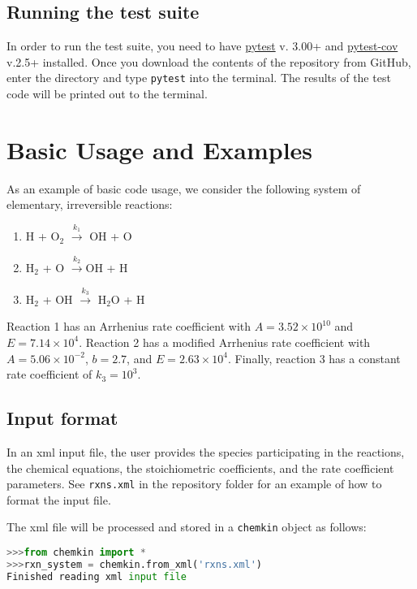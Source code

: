 \documentclass[12pt]{article}
\begin{document}
\subsection{Running the test suite}
In order to run the test suite, you need to have \href{https://docs.pytest.org/en/latest/}{pytest} v. 3.00+ and \href{https://pypi.python.org/pypi/pytest-cov}{pytest-cov} v.2.5+ installed. Once you download the contents of the repository from GitHub, enter the directory and type {\tt pytest} into the terminal. The results of the test code will be printed out to the terminal.

\section{Basic Usage and Examples}
As an example of basic code usage, we consider the following system of elementary, irreversible reactions:

\begin{enumerate}
\item H + O$_2$ $\overset{k_1}{\rightarrow}$ OH + O
\item H$_2$ + O $\overset{k_2}{\rightarrow}$OH + H
\item H$_2$ + OH $\overset{k_3}{\rightarrow}$ H$_2$O + H
\end{enumerate}

Reaction 1 has an Arrhenius rate coefficient with $A = 3.52\times 10^{10}$ and $E = 7.14\times 10^4$. Reaction 2 has a modified Arrhenius rate coefficient with $A = 5.06\times 10^{-2}$, $b = 2.7$, and $E = 2.63\times10^4$. Finally, reaction 3 has a constant rate coefficient of $k_3 = 10^3$.



\subsection{Input format}
In an xml input file, the user provides the species participating in the reactions, the chemical equations, the stoichiometric coefficients, and the rate coefficient parameters. See {\tt rxns.xml} in the repository folder for an example of how to format the input file. 

The xml file will be processed and stored in a {\tt chemkin} object as follows:
\begin{lstlisting}[language = Python, basicstyle = \ttfamily, breaklines = True, columns = fullflexible]
>>>from chemkin import *
>>>rxn_system = chemkin.from_xml('rxns.xml')
Finished reading xml input file
\end{lstlisting}
\end{document}
